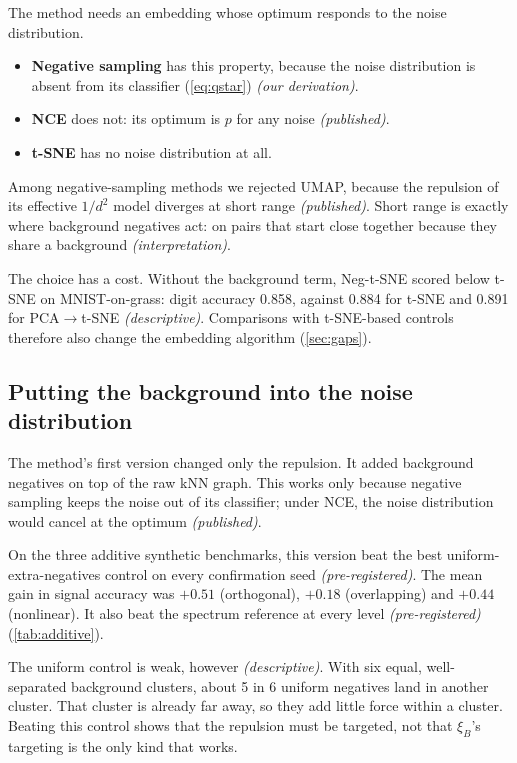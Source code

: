 \documentclass[10pt]{article}
\newcommand{\cpub}{\textit{\small (published)}}
\newcommand{\cder}{\textit{\small (our derivation)}}
\newcommand{\cpre}{\textit{\small (pre-registered)}}
\newcommand{\cdesc}{\textit{\small (descriptive)}}
\newcommand{\cinterp}{\textit{\small (interpretation)}}
\newcommand{\xiB}{\xi_{B}}
\begin{document}
The method needs an embedding whose optimum responds to the noise distribution.
\begin{itemize}
  \item \textbf{Negative sampling} has this property, because the noise distribution is absent from its classifier (\cref{eq:qstar}) \cder.
  \item \textbf{NCE} does not: its optimum is $p$ for any noise \cpub.
  \item \textbf{t-SNE} has no noise distribution at all.
\end{itemize}

Among negative-sampling methods we rejected UMAP, because the repulsion of its effective $1/d^2$ model diverges at short range \cpub. Short range is exactly where background negatives act: on pairs that start close together because they share a background \cinterp.

The choice has a cost. Without the background term, Neg-t-SNE scored below t-SNE on MNIST-on-grass: digit accuracy 0.858, against 0.884 for t-SNE and 0.891 for PCA$\to$t-SNE \cdesc. Comparisons with t-SNE-based controls therefore also change the embedding algorithm (\cref{sec:gaps}).

\subsection{Putting the background into the noise distribution}
\label{sec:dec-noise}

The method's first version changed only the repulsion. It added background negatives on top of the raw kNN graph. This works only because negative sampling keeps the noise out of its classifier; under NCE, the noise distribution would cancel at the optimum \cpub.

On the three additive synthetic benchmarks, this version beat the best uniform-extra-negatives control on every confirmation seed \cpre. The mean gain in signal accuracy was $+0.51$ (orthogonal), $+0.18$ (overlapping) and $+0.44$ (nonlinear). It also beat the spectrum reference at every level \cpre{} (\cref{tab:additive}).

The uniform control is weak, however \cdesc. With six equal, well-separated background clusters, about 5 in 6 uniform negatives land in another cluster. That cluster is already far away, so they add little force within a cluster. Beating this control shows that the repulsion must be targeted, not that $\xiB$'s targeting is the only kind that works.
\end{document}
